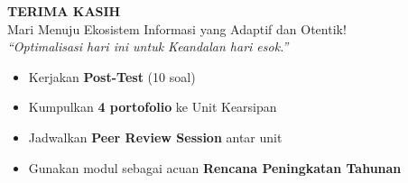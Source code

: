 \documentclass[aspectratio=169,11pt]{beamer}
\begin{document}
\begin{frame}{}
    \vspace{0.5cm}
    \begin{center}
        \huge \textcolor{plnblue}{\textbf{TERIMA KASIH}}\\[0.3cm]
        \large Mari Menuju Ekosistem Informasi yang Adaptif dan Otentik!\\[0.6cm]
        \normalsize \textit{``Optimalisasi hari ini untuk Keandalan hari esok.''}
    \end{center}
    \vspace{0.4cm}
    \begin{center}
        \begin{minipage}{0.65\textwidth}
            \begin{greenbox}
                \scriptsize
                \begin{itemize}
                    \item Kerjakan \textbf{Post-Test} (10 soal)
                    \item Kumpulkan \textbf{4 portofolio} ke Unit Kearsipan
                    \item Jadwalkan \textbf{Peer Review Session} antar unit
                    \item Gunakan modul sebagai acuan \textbf{Rencana Peningkatan Tahunan}
                \end{itemize}
            \end{greenbox}
        \end{minipage}
    \end{center}
\end{frame}
\end{document}
